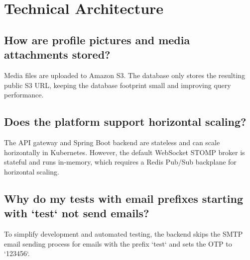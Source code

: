 \section{Technical Architecture}

\subsection{How are profile pictures and media attachments stored?}
Media files are uploaded to Amazon S3. The database only stores the resulting public S3 URL, keeping the database footprint small and improving query performance.

\subsection{Does the platform support horizontal scaling?}
The API gateway and Spring Boot backend are stateless and can scale horizontally in Kubernetes. However, the default WebSocket STOMP broker is stateful and runs in-memory, which requires a Redis Pub/Sub backplane for horizontal scaling.

\subsection{Why do my tests with email prefixes starting with `test` not send emails?}
To simplify development and automated testing, the backend skips the SMTP email sending process for emails with the prefix `test` and sets the OTP to `123456`.
